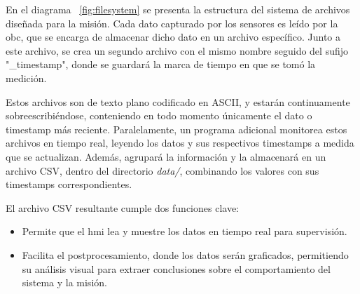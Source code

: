    En el diagrama ~\ref{fig:filesystem} se presenta la estructura del sistema de archivos diseñada para la misión.
   Cada dato capturado por los sensores es leído por la \acrshort{obc}, que se encarga de almacenar dicho dato en un archivo
   específico. Junto a este archivo, se crea un segundo archivo con el mismo nombre seguido del sufijo "\_timestamp",
   donde se guardará la marca de tiempo en que se tomó la medición.
   
   Estos archivos son de texto plano codificado en ASCII, y estarán continuamente sobreescribiéndose, conteniendo en
   todo momento únicamente el dato o timestamp más reciente. Paralelamente, un programa adicional monitorea estos
   archivos en tiempo real, leyendo los datos y sus respectivos timestamps a medida que se actualizan. Además, agrupará
   la información y la almacenará en un archivo CSV, dentro del directorio \textit{data/}, combinando los valores con
   sus timestamps correspondientes.

   El archivo CSV resultante cumple dos funciones clave:
    \begin{itemize}
        \item Permite que el \acrshort{hmi} lea y muestre los datos en tiempo real para supervisión.
        \item Facilita el postprocesamiento, donde los datos serán graficados, permitiendo su análisis visual
        para extraer conclusiones sobre el comportamiento del sistema y la misión.
    \end{itemize}

